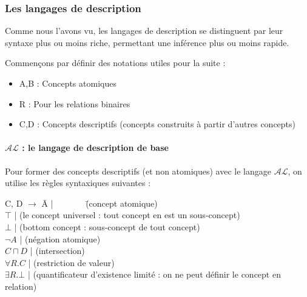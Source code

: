 \subsubsection{Les langages de description}
\label{sec:les-langages-de}

\par Comme nous l'avons vu, les langages de description se distinguent par leur syntaxe plus ou moins riche, permettant une inférence plus ou moins rapide.

\par Commençons par définir des notations utiles pour la suite :
\begin{itemize}
\item A,B : Concepts atomiques
\item R : Pour les relations binaires
\item C,D : Concepts descriptifs (concepts construits à partir d'autres concepts)
\end{itemize}

\paragraph{$\mathcal{AL}$ : le langage de description de base}
\label{sec::le-langage-de}

\par Pour former des concepts descriptifs (et non atomiques) avec le langage $\mathcal{AL}$, on utilise les règles syntaxiques suivantes :
\begin{tabbing}
  C, D  $\longrightarrow{}$ \= A | \ \ \ \ \ \ \ \= (concept atomique)\\
  \> $\top{}$ | \>(le concept universel : tout concept en est un sous-concept)\\
  \> $\bot{}$ | \>(bottom concept : sous-concept de tout concept) \\
  \> $\neg{}A$ | \>(négation atomique) \\
  \> $C\sqcap D$ | \>(intersection) \\
  \> $\forall{}R.C$ | \> (restriction de valeur) \\
  \> $\exists R.\bot$ | \> (quantificateur d'existence limité : on ne peut définir le concept en relation)\\

\end{tabbing}


